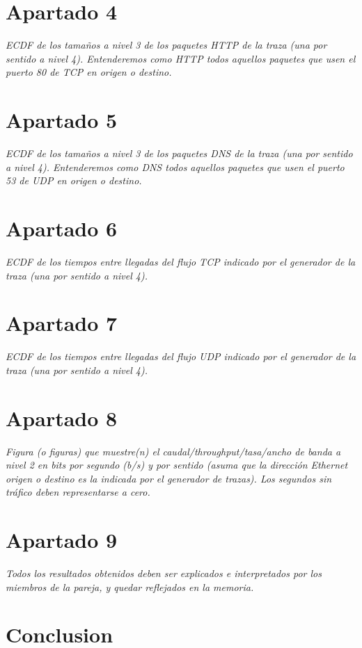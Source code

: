 \documentclass[11pt]{article} %
\begin{document}
\section{Apartado 4}
\emph{ECDF de los tamaños a nivel 3 de los paquetes HTTP de la traza (una por sentido a nivel 4). Entenderemos como HTTP todos aquellos paquetes que usen el puerto 80 de TCP en origen o destino.}



\section{Apartado 5}
\emph{ECDF de los tamaños a nivel 3 de los paquetes DNS de la traza (una por sentido a nivel 4). Entenderemos como DNS todos aquellos paquetes que usen el puerto 53 de UDP en origen o destino.}



\section{Apartado 6}
\emph{ECDF de los tiempos entre llegadas del flujo TCP indicado por el generador de la traza (una por sentido a nivel 4).}



\section{Apartado 7}
\emph{ECDF de los tiempos entre llegadas del flujo UDP indicado por el generador de la traza (una por sentido a nivel 4).}



\section{Apartado 8}
\emph{Figura (o figuras) que muestre(n) el caudal/throughput/tasa/ancho de banda a nivel 2 en bits por segundo (b/s) y por sentido (asuma que la dirección Ethernet origen o destino es la indicada por el generador de trazas). Los segundos sin tráfico deben representarse a cero.}



\section{Apartado 9}
\emph{Todos los resultados obtenidos deben ser explicados e interpretados por los miembros de la pareja, y quedar reflejados en la memoria.}



\section{Conclusion}
\end{document}
